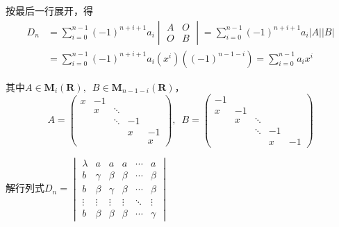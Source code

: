 \begin{solution}
    按最后一行展开，得
    \begin{align*}
        D_n & =\sum_{i=0}^{n-1}(-1)^{n+i+1}a_i\begin{vmatrix} A & O \\ O & B \end{vmatrix}
        =\sum_{i=0}^{n-1}(-1)^{n+i+1}a_i|A||B|                                                        \\
            & =\sum_{i=0}^{n-1}(-1)^{n+i+1}a_i(x^i)\left((-1)^{n-1-i}\right) =\sum_{i=0}^{n-1}a_i x^i
    \end{align*}

    其中$A\in \mathbf{M}_i(\mathbf{R}),\enspace B\in \mathbf{M}_{n-1-i}(\mathbf{R})$，
    \[ A=\begin{pmatrix}
            x & -1 &        &    &    \\
              & x  & \ddots &    &    \\
              &    & \ddots & -1 &    \\
              &    &        & x  & -1 \\
              &    &        &    & x
        \end{pmatrix},\enspace
        B=\begin{pmatrix}
            -1 &    &        &    &    \\
            x  & -1 &        &    &    \\
               & x  & \ddots &    &    \\
               &    & \ddots & -1 &    \\
               &    &        & x  & -1
        \end{pmatrix} \]
\end{solution}

\begin{example}{}{}
    解行列式$D_n=\begin{vmatrix}
            \lambda & a      & a      & a      & \cdots & a      \\
            b       & \gamma & \beta  & \beta  & \cdots & \beta  \\
            b       & \beta  & \gamma & \beta  & \cdots & \beta  \\
            \vdots  & \vdots & \vdots & \vdots & \ddots & \vdots \\
            b       & \beta  & \beta  & \beta  & \cdots & \gamma
        \end{vmatrix}$
\end{example}


